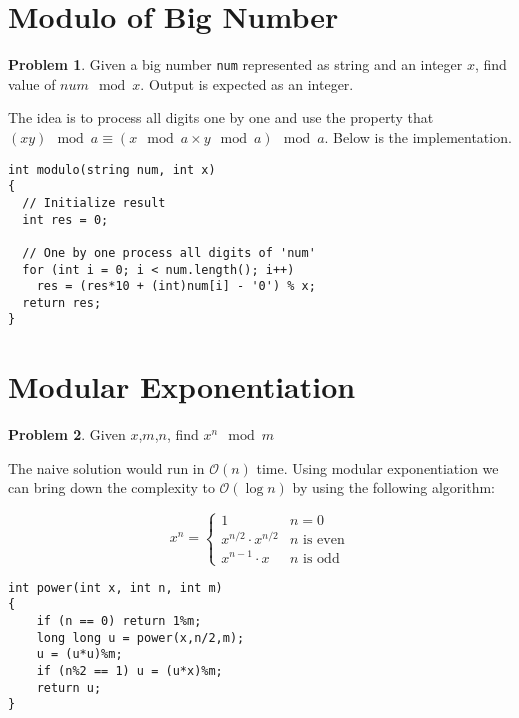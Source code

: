 \documentclass[twoside,12pt,a4paper,english]{book}
\theoremstyle{definition}
\theoremstyle{problemstyle}
\newtheorem*{problem}{Problem} %
\theoremstyle{problemstyle}
\theoremstyle{problemstyle}
\begin{document}
\section{Modulo of Big Number}
\begin{problem}
  Given a big number \texttt{num} represented as string and an integer $x$, find value of $num \mod x$. Output is expected as an integer.
\end{problem}
\begin{tcolorbox}[title=Solution]

The idea is to process all digits one by one and use the property that $(xy) \mod a \equiv (x \mod a \times y \mod a) \mod a$. Below is the implementation.
\begin{lstlisting}
int modulo(string num, int x)
{
  // Initialize result
  int res = 0;

  // One by one process all digits of 'num'
  for (int i = 0; i < num.length(); i++)
    res = (res*10 + (int)num[i] - '0') % x;
  return res;
}
\end{lstlisting}
\end{tcolorbox}
\section{Modular Exponentiation}
\begin{problem}
Given $x$,$m$,$n$, find $x^n \mod m$
\end{problem}
\begin{tcolorbox}[title=Solution]

The naive solution would run in $\mathcal{O}(n)$ time. Using modular exponentiation we can bring down the complexity to $\mathcal{O}(\log{n})$ by using the following algorithm:

\begin{equation*}
    x^n = \begin{cases}
               1        & n = 0\\
               x^{n/2} \cdot x^{n/2} & \text{$n$ is even}\\
               x^{n-1} \cdot x & \text{$n$ is odd}
           \end{cases}
\end{equation*}

\begin{lstlisting}
int power(int x, int n, int m)
{
    if (n == 0) return 1%m;
    long long u = power(x,n/2,m);
    u = (u*u)%m;
    if (n%2 == 1) u = (u*x)%m;
    return u;
}
\end{lstlisting}

\end{tcolorbox}
\end{document}
